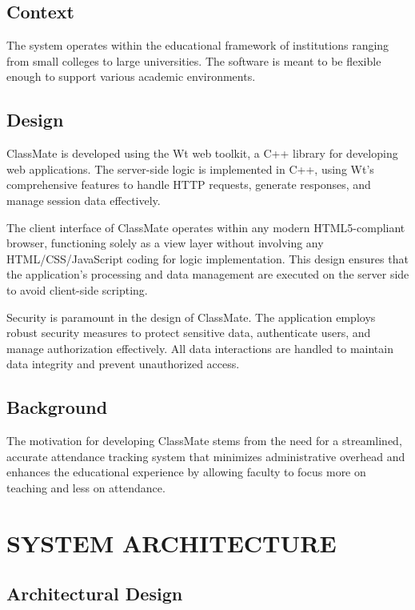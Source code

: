 \documentclass[letterpaper,12pt,oneside,listof=totoc]{scrreprt}
\begin{document}
\section{Context}

The system operates within the educational framework of institutions ranging from small colleges to large universities. The software is meant to be flexible enough to support various academic environments. 

\section{Design}

ClassMate is developed using the Wt web toolkit, a C++ library for developing web applications. The server-side logic is implemented in C++, using Wt's comprehensive features to handle HTTP requests, generate responses, and manage session data effectively.

The client interface of ClassMate operates within any modern HTML5-compliant browser, functioning solely as a view layer without involving any HTML/CSS/JavaScript coding for logic implementation. This design ensures that the application's processing and data management are executed on the server side to avoid client-side scripting.

Security is paramount in the design of ClassMate. The application employs robust security measures to protect sensitive data, authenticate users, and manage authorization effectively. All data interactions are handled to maintain data integrity and prevent unauthorized access.

\section{Background}

The motivation for developing ClassMate stems from the need for a streamlined, accurate attendance tracking system that minimizes administrative overhead and enhances the educational experience by allowing faculty to focus more on teaching and less on attendance.



\chapter{SYSTEM ARCHITECTURE}

\section{Architectural Design}
\end{document}
